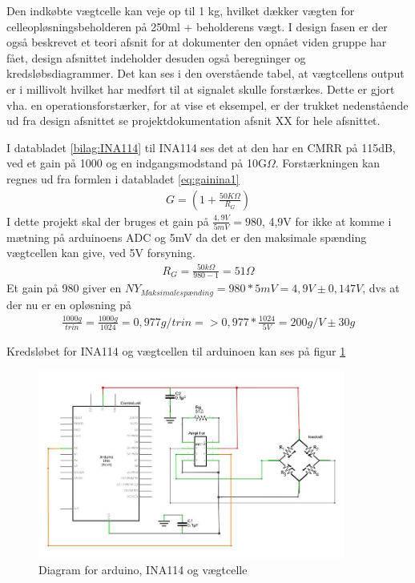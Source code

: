 Den indkøbte vægtcelle kan veje op til 1 kg, hvilket dækker vægten for celleopløsningsbeholderen på 250ml + beholderens vægt. I design fasen er der også beskrevet et teori afsnit for at dokumenter den opnået viden gruppe har fået, design afsnittet indeholder desuden også beregninger og kredsløbsdiagrammer. Det kan ses i den overstående tabel, at vægtcellens output er i millivolt hvilket har medført til at signalet skulle forstærkes. Dette er gjort vha. en operationsforstærker, for at vise et eksempel, er der trukket nedenstående ud fra design afsnittet se projektdokumentation afsnit XX  for hele afsnittet. 

I databladet \ref{bilag:INA114} til INA114 ses det at den har en CMRR på 115dB, ved et gain på 1000 og en indgangsmodstand på 10G$\Omega$. Forstærkningen kan regnes ud fra formlen i databladet \ref{eq:gainina1}
\begin{align}
 G=(1+\frac{50K\Omega}{R_{G}})
 \label{eq:gainina1}
 \end{align} 
 I dette projekt skal der bruges et gain på $\frac{4,9V}{5mV}=980$, 4,9V for ikke at komme i mætning på arduinoens ADC og 5mV da det er den maksimale spænding vægtcellen kan give, ved 5V forsyning.
 \begin{align}
 R_{G}=\frac{50k\Omega}{980-1}=51\Omega
 \label{eq:gainina2}
 \end{align}
Et gain på 980 giver en $NY_{Maksimalespænding}=980*5mV=4,9V \pm0,147V$, dvs at der nu er en opløsning på
\begin{align}
 \frac{1000g}{trin}=\frac{1000g}{1024}=0,977g/trin=>0,977*\frac{1024}{5V}=200g/V \pm30g
 \label{eq:gainina3}
 \end{align}
 
 Kredsløbet for INA114 og vægtcellen til arduinoen kan ses på figur \ref{fig:loadcelldiagram}
 
  \begin{figure}[H]
	\centering
	\includegraphics[width=0.9\textwidth]{billeder/Hardware/diagrammer/loadcelldiagram.JPG}
	\caption{Diagram for arduino, INA114 og vægtcelle}
	\label{fig:loadcelldiagram}
\end{figure}

